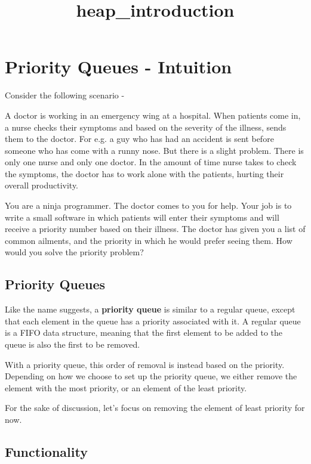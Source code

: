 \documentclass[11pt]{article}
\title{heap\_introduction}
\begin{document}
    
    
    \maketitle
    
    

    
    \section{Priority Queues - Intuition}\label{priority-queues---intuition}

Consider the following scenario -

A doctor is working in an emergency wing at a hospital. When patients
come in, a nurse checks their symptoms and based on the severity of the
illness, sends them to the doctor. For e.g. a guy who has had an
accident is sent before someone who has come with a runny nose. But
there is a slight problem. There is only one nurse and only one doctor.
In the amount of time nurse takes to check the symptoms, the doctor has
to work alone with the patients, hurting their overall productivity.

You are a ninja programmer. The doctor comes to you for help. Your job
is to write a small software in which patients will enter their symptoms
and will receive a priority number based on their illness. The doctor
has given you a list of common ailments, and the priority in which he
would prefer seeing them. How would you solve the priority problem?

    \subsection{Priority Queues}\label{priority-queues}

Like the name suggests, a \textbf{priority queue} is similar to a
regular queue, except that each element in the queue has a priority
associated with it. A regular queue is a FIFO data structure, meaning
that the first element to be added to the queue is also the first to be
removed.

With a priority queue, this order of removal is instead based on the
priority. Depending on how we choose to set up the priority queue, we
either remove the element with the most priority, or an element of the
least priority.

For the sake of discussion, let's focus on removing the element of least
priority for now.

    \subsection{Functionality}\label{functionality}
\end{document}
